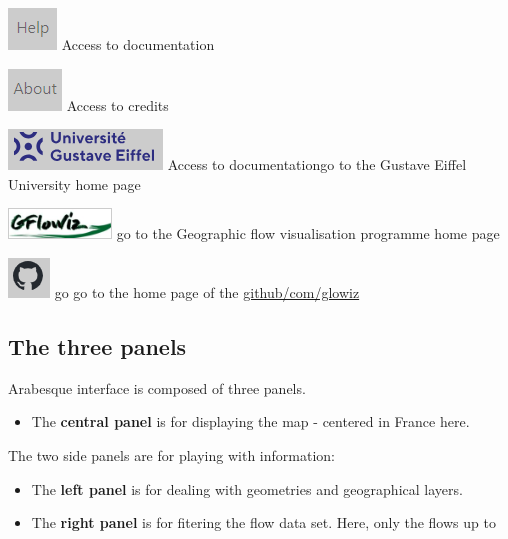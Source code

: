 \documentclass[
  letterpaper,
  DIV=11,
  numbers=noendperiod]{scrreprt}
\providecommand{\tightlist}{%
  \setlength{\itemsep}{0pt}\setlength{\parskip}{0pt}}\usepackage{longtable,booktabs,array}
\begin{document}
\includegraphics{images/main_doc.png} Access to documentation

\includegraphics{images/main_about.png} Access to credits

\href{https://www.univ-gustave-eiffel.fr/}{\includegraphics{images/main_univ-gustave-eiffel.PNG}}
Access to documentationgo to the Gustave Eiffel University home page

\href{https://geoflowiz.hypotheses.org/accueil/le-projet-gflowiz}{\includegraphics{images/main_gflowiz_program.PNG}}
go to the Geographic flow visualisation programme home page

\href{https://github.com/gflowiz}{\includegraphics{images/main_github-gflowiz.png}}
go go to the home page of the
\href{https://github.com/gflowiz/arabesque-dev}{github/com/glowiz}

\subsection{The three panels}\label{the-three-panels}

Arabesque interface is composed of three panels.

\begin{itemize}
\tightlist
\item
  The \textbf{central panel} is for displaying the map - centered in
  France here.
\end{itemize}

The two side panels are for playing with information:

\begin{itemize}
\item
  The \textbf{left panel} is for dealing with geometries and
  geographical layers.
\item
  The \textbf{right panel} is for fitering the flow data set. Here, only
  the flows up to
\end{itemize}
\end{document}
